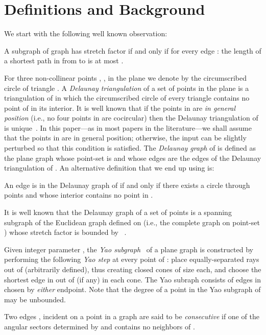\documentclass{stacs_proc}
\theoremstyle{plain}\newtheorem{satz}[thm]{Satz}
\begin{document}
\section{Definitions and Background}
\label{background}

We start with the following well known observation:
\begin{observation} \label{optimal} A subgraph  of graph  has
stretch factor  if and only if for every edge : the
length of a shortest path in  from  to  is at most .
\end{observation}
For three non-collinear points , ,  in the plane we denote
by  the circumscribed circle of triangle
. A {\em Delaunay triangulation} of a set of points  in
the plane is a triangulation of  in which the circumscribed circle of every
triangle contains no point of  in its interior. It is well known
that if the points in  are {\em in general position} (i.e., no
four points in  are cocircular) then the Delaunay triangulation
of  is unique~\cite{book}. In this paper---as in most papers in
the literature---we shall assume that the points in  are in
general position; otherwise, the input can be slightly perturbed so
that this condition is satisfied. The {\em Delaunay graph} of  is
defined as the plane graph whose point-set is  and whose edges
are the edges of the Delaunay triangulation of . An alternative definition
that we end up using is:
\begin{definition}
\label{DelaunayDef}
An edge  is in the Delaunay graph of  if and only if there exists a
circle through points  and  whose interior contains no point in .
\end{definition}
It is well known
that the Delaunay graph of a set of points  is a spanning
subgraph of the Euclidean graph defined on  (i.e., the complete
graph on point-set ) whose stretch factor is bounded by ~\cite{keil}.

Given integer parameter , the {\em Yao subgraph}~\cite{yao}
of a plane graph  is constructed by performing the
following {\em Yao step} at every point  of : place  equally-separated
rays out of  (arbitrarily defined), thus creating  closed cones of
size  each, and choose the shortest edge in  out of  (if
any) in each cone. The Yao subraph consists of edges in  chosen by
{\em either} endpoint. Note that the degree of a point in the Yao subgraph
of  may be unbounded.

Two edges ,  incident on a point  in a graph  are said
to be {\em consecutive} if one of the angular sectors determined by
 and  contains no neighbors of .
\end{document}
